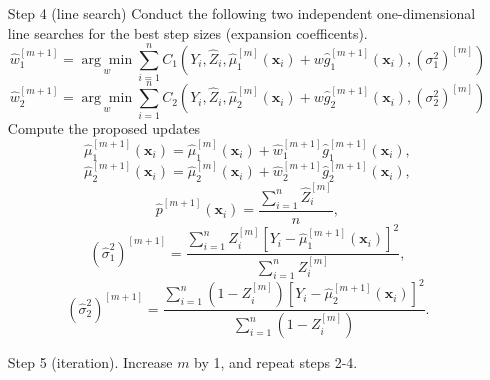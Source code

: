\documentclass[11pt]{article}
\numberwithin{equation}{section}
\def\bx{\boldsymbol{x}}
\begin{document}
\begin{itemize}
\begin{itemize}
	\end{itemize}
	\item[Step 4] (line search) Conduct the following two independent one-dimensional line searches for the best step sizes (expansion coefficents).
	$$\hat{w}_{1}^{[m+1]}=\underset{w}{\arg\min}\sum_{i=1}^n C_{1}(Y_i,\hat{Z}_i,\hat{\mu}_1^{[m]}(\bx_i)+w\hat{g}_1^{[m+1]}(\bx_i),(\sigma_1^2)^{[m]})$$
	$$\hat{w}_{2}^{[m+1]}=\underset{w}{\arg\min}\sum_{i=1}^n C_{2}(Y_i,\hat{Z}_i,\hat{\mu}_2^{[m]}(\bx_i)+w\hat{g}_2^{[m+1]}(\bx_i),(\sigma_2^2)^{[m]})$$
	Compute the proposed updates
	$$\hat{\mu}_1^{[m+1]}(\bx_i)=\hat{\mu}_1^{[m]}(\bx_i)+\hat{w}_{1}^{[m+1]}\hat{g}_{1}^{[m+1]}(\bx_i),$$
	$$\hat{\mu}_2^{[m+1]}(\bx_i)=\hat{\mu}_2^{[m]}(\bx_i)+\hat{w}_{2}^{[m+1]}\hat{g}_{2}^{[m+1]}(\bx_i),$$
	$$\hat{p}^{[m+1]}(\bx_i)=\frac{\sum_{i=1}^n \hat{Z}_i^{[m]}}{n},$$
	$$(\hat{\sigma}_1^2)^{[m+1]}=\frac{\sum_{i=1}^n Z_i^{[m]}[Y_i-\hat{\mu}_1^{[m+1]}(\bx_i)]^2}{\sum_{i=1}^n Z_i^{[m]}},$$
	$$(\hat{\sigma}_2^2)^{[m+1]}=\frac{\sum_{i=1}^n(1-Z_i^{[m]})[Y_i-\hat{\mu}_2^{[m+1]}(\bx_i)]^2}{\sum_{i=1}^n(1-Z_i^{[m]})}.$$
	\item[Step 5] (iteration). Increase $m$ by 1, and repeat steps 2-4.
\end{itemize}


\end{document}
